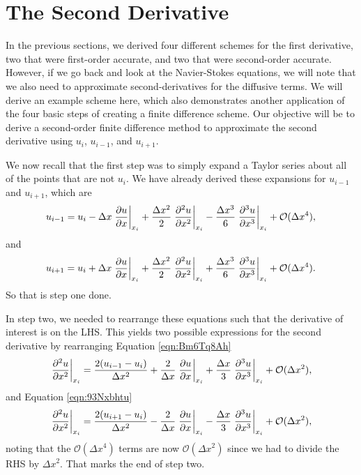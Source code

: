 \section{The Second Derivative}
In the previous sections, we derived four different schemes for the first derivative, two that were first-order accurate, and two that were second-order accurate. However, if we go back and look at the Navier-Stokes equations, we will note that we also need to approximate second-derivatives for the diffusive terms. We will derive an example scheme here, which also demonstrates another application of the four basic steps of creating a finite difference scheme. Our objective will be to derive a second-order finite difference method to approximate the second derivative using $u_i$, $u_{i-1}$, and $u_{i+1}$.

We now recall that the first step was to simply expand a Taylor series about all of the points that are not $u_i$. We have already derived these expansions for $u_{i-1}$ and $u_{i+1}$, which are
\begin{equation}
	u_{i-1} = u_i - \Delta x \left.\frac{\partial u}{\partial x}\right\rvert_{x_i}^{} + \frac{\Delta x^2}{2} \left.\frac{\partial^2 u}{\partial x^2}\right\rvert_{x_i}^{} - \frac{\Delta x^3}{6} \left.\frac{\partial^3 u}{\partial x^3}\right\rvert_{x_i}^{} + \mathcal{O}(\Delta x^4),
	\label{eqn:Bm6Tq8Ah}
\end{equation}
and
\begin{equation}
	u_{i+1} = u_i + \Delta x \left.\frac{\partial u}{\partial x}\right\rvert_{x_i}^{} + \frac{\Delta x^2}{2} \left.\frac{\partial^2 u}{\partial x^2}\right\rvert_{x_i}^{} + \frac{\Delta x^3}{6} \left.\frac{\partial^3 u}{\partial x^3}\right\rvert_{x_i}^{} + \mathcal{O}(\Delta x^4).
	\label{eqn:93Nxbhtu}
\end{equation}
So that is step one done.

In step two, we needed to rearrange these equations such that the derivative of interest is on the LHS. This yields two possible expressions for the second derivative by rearranging Equation \ref{eqn:Bm6Tq8Ah}
\begin{equation}
	\left.\frac{\partial^2 u}{\partial x^2}\right\rvert_{x_i}^{} = \frac{2(u_{i-1} - u_i)}{\Delta x^2} + \frac{2}{\Delta x} \left.\frac{\partial u}{\partial x}\right\rvert_{x_i}^{} + \frac{\Delta x}{3} \left.\frac{\partial^3 u}{\partial x^3}\right\rvert_{x_i}^{} + \mathcal{O}(\Delta x^2),
\end{equation}
and Equation \ref{eqn:93Nxbhtu}
\begin{equation}
	\left.\frac{\partial^2 u}{\partial x^2}\right\rvert_{x_i}^{} = \frac{2(u_{i+1} - u_i)}{\Delta x^2} - \frac{2}{\Delta x} \left.\frac{\partial u}{\partial x}\right\rvert_{x_i}^{} - \frac{\Delta x}{3} \left.\frac{\partial^3 u}{\partial x^3}\right\rvert_{x_i}^{} + \mathcal{O}(\Delta x^2),
\end{equation}
noting that the $\mathcal{O}(\Delta x^4)$ terms are now $\mathcal{O}(\Delta x^2)$ since we had to divide the RHS by $\Delta x^2$. That marks the end of step two.

